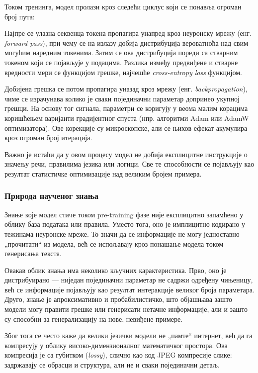 Током тренинга, модел пролази кроз следећи циклус који се понавља огроман број пута:

Најпре се улазна секвенца токена пропагира унапред кроз неуронску мрежу (енг. \textit{forward pass}), при чему се на излазу добија дистрибуција вероватноћа над свим могућим наредним токенима. Затим се ова дистрибуција пореди са стварним токеном који се појављује у подацима. Разлика између предвиђене и стварне вредности мери се функцијом грешке, најчешће \textit{cross-entropy loss} функцијом.

Добијена грешка се потом пропагира уназад кроз мрежу (енг. \textit{backpropagation}), чиме се израчунава колико је сваки појединачни параметар допринео укупној грешци. На основу тог сигнала, параметри се коригују у веома малим корацима коришћењем варијанти градијентног спуста (нпр. алгоритми Adam или AdamW оптимизатора). Ове корекције су микроскопске, али се њихов ефекат акумулира кроз огроман број итерација.

Важно је истаћи да у овом процесу модел не добија експлицитне инструкције о значењу речи, правилима језика или логици. Све те способности се појављују као резултат статистичке оптимизације над великим бројем примера.

\subsubsection{Природа наученог знања}

Знање које модел стиче током pre-training фазе није експлицитно запамћено у облику база података или правила. Уместо тога, оно је имплицитно кодирано у тежинама неуронске мреже. То значи да се информације не могу једноставно „прочитати“ из модела, већ се испољавају кроз понашање модела током генерисања текста.

Овакав облик знања има неколико кључних карактеристика. Прво, оно је дистрибуирано — ниједан појединачни параметар не садржи одређену чињеницу, већ се информације појављују као резултат интеракције великог броја параметара. Друго, знање је апроксимативно и пробабилистичко, што објашњава зашто модели могу правити грешке или генерисати нетачне информације, али и зашто су способни за генерализацију на нове, невиђене примере.

Због тога се често каже да велики језички модели не „памте“ интернет, већ да га компресују у облику високо-димензионалног математичког простора. Ова компресија је са губитком (\textit{lossy}), слично као код JPEG компресије слике: задржавају се обрасци и структура, али не и сваки појединачни детаљ.

